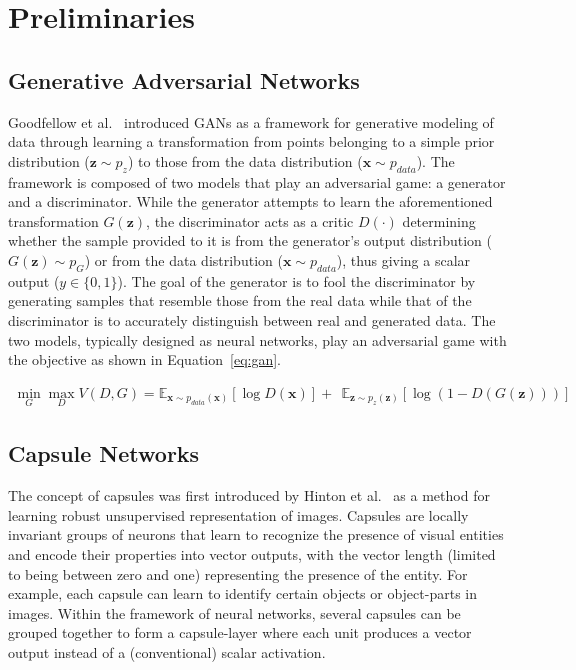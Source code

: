 \section{Preliminaries}
\label{sec:prelim}

\subsection{Generative Adversarial Networks}
Goodfellow et al.~\cite{bib:gan} introduced GANs as a framework for generative modeling of data through learning a transformation from points belonging to a simple prior distribution ($\mathbf{z} \sim p_z$) to those from the data distribution ($\mathbf{x} \sim p_{data}$). The framework is composed of two models that play an adversarial game: a generator and a discriminator. While the generator attempts to learn the aforementioned transformation $G(\mathbf{z})$, the discriminator acts as a critic $D(\cdot)$ determining whether the sample provided to it is from the generator's output distribution ($G(\mathbf{z}) \sim p_G$) or from the data distribution ($\mathbf{x} \sim p_{data}$), thus giving a scalar output ($y \in \{0, 1\}$). The goal of the generator is to fool the discriminator by generating samples that resemble those from the real data while that of the discriminator is to accurately distinguish between real and generated data. The two models, typically designed as neural networks, play an adversarial game with the objective as shown in Equation~\ref{eq:gan}.

\begin{align}
\min_{G} \max_{D} V(D, G) = \mathbb{E}_{\mathbf{x} \sim p_{data}(\mathbf{x})} \left [ \log D(\mathbf{x}) \right ] + \ \ \mathbb{E}_{\mathbf{z} \sim p_{z}(\mathbf{z})} \left [ \log (1 - D(G(\mathbf{z}))) \right ]
\label{eq:gan}
\end{align}

\subsection{Capsule Networks}

The concept of capsules was first introduced by Hinton et al.~\cite{bib:transauto} as a method for learning robust unsupervised representation of images. Capsules are locally invariant groups of neurons that learn to recognize the presence of visual entities and encode their properties into vector outputs, with the vector length (limited to being between zero and one) representing the presence of the entity. For example, each capsule can learn to identify certain objects or object-parts in images. Within the framework of neural networks, several capsules can be grouped together to form a capsule-layer where each unit produces a vector output instead of a (conventional) scalar activation.

